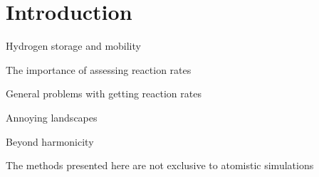 \chapter{Introduction}
\label{chap:introduction}

\bit
\item Hydrogen storage and mobility
\item The importance of assessing reaction rates
\item General problems with getting reaction rates
\item Annoying landscapes
\item Beyond harmonicity
\item The methods presented here are not exclusive to atomistic simulations
\eit

\placeholder


